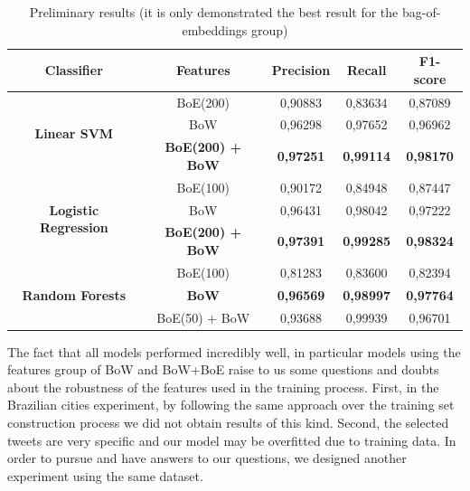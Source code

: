 \begin{table}[!bp]
	\centering
	\caption[New York City First Experiment Results]{Preliminary results (it is only demonstrated the best result for the bag-of-embeddings group)}
	\label{tab:first_experiment}
	\begin{tabular}{|c|c|c|c|c|}
		\hline
		\textbf{Classifier} & \textbf{Features} & \textbf{Precision} & \textbf{Recall} & \textbf{F1-score} \\ \hline
		\multirow{3}{*}{\textbf{Linear SVM}} & BoE(200) & 0,90883 & 0,83634 & 0,87089 \\
		& BoW & 0,96298 & 0,97652 & 0,96962 \\
		& \textbf{BoE(200) + BoW} & \textbf{0,97251} & \textbf{0,99114} & \textbf{0,98170} \\ \hline
		\multirow{3}{*}{\textbf{Logistic Regression}} & BoE(100) & 0,90172 & 0,84948 & 0,87447 \\
		& BoW & 0,96431 & 0,98042 & 0,97222 \\
		& \textbf{BoE(200) + BoW} & \textbf{0,97391} & \textbf{0,99285} & \textbf{0,98324} \\ \hline
		\multirow{3}{*}{\textbf{Random Forests}} & BoE(100) & 0,81283 & 0,83600 & 0,82394 \\
		& \textbf{BoW} & \textbf{0,96569} & \textbf{0,98997} & \textbf{0,97764} \\
		& BoE(50) + BoW & 0,93688 & 0,99939 & 0,96701 \\ \hline
	\end{tabular}
\end{table}

The fact that all models performed incredibly well, in particular models using the features group of \gls{BoW} and \gls{BoW}+\gls{BoE} raise to us some questions and doubts about the robustness of the features used in the training process. First, in the Brazilian cities experiment, by following the same approach over the training set construction process we did not obtain results of this kind. Second, the selected tweets are very specific and our model may be overfitted due to training data. In order to pursue and have answers to our questions, we designed another experiment using the same dataset.


